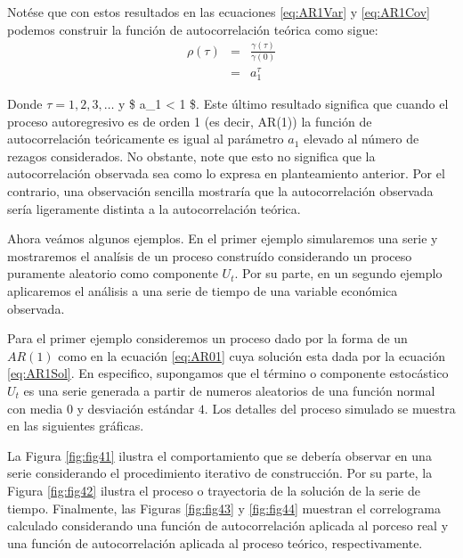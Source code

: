 \documentclass[
]{book}
\begin{document}
Notése que con estos resultados en las ecuaciones \eqref{eq:AR1Var} y \eqref{eq:AR1Cov} podemos construir la función de autocorrelación
teórica como sigue:
\begin{eqnarray}
    \rho(\tau) & = & \frac{\gamma(\tau)}{\gamma(0)} \nonumber \\
    & = & a_1^\tau
\end{eqnarray}

Donde \(\tau = 1, 2, 3, \ldots\) y \$ \textbar a\_1\textbar{} \textless{} 1 \$. Este último resultado significa que cuando el proceso autoregresivo es de orden 1
(es decir, AR(1)) la función de autocorrelación teóricamente es igual al parámetro \(a_1\) elevado al número de rezagos considerados. No obstante, note que esto no significa que la autocorrelación observada sea como lo expresa en planteamiento anterior. Por el contrario, una observación sencilla mostraría que la autocorrelación observada sería ligeramente distinta a la autocorrelación teórica.

Ahora veámos algunos ejemplos. En el primer ejemplo simularemos una serie y mostraremos el analísis de un proceso construído considerando un proceso puramente aleatorio como componente \(U_t\). Por su parte, en un segundo ejemplo aplicaremos el análisis a una serie de tiempo de una variable económica observada.

Para el primer ejemplo consideremos un proceso dado por la forma de un \(AR(1)\) como en la ecuación \eqref{eq:AR01} cuya solución esta dada por la ecuación \eqref{eq:AR1Sol}. En especifico, supongamos que el término o componente estocástico \(U_t\) es una serie generada a partir de numeros aleatorios de una función normal con media \(0\) y desviación estándar \(4\). Los detalles del proceso simulado se muestra en las siguientes gráficas.

La Figura \ref{fig:fig41} ilustra el comportamiento que se debería observar en una serie considerando el procedimiento iterativo de
construcción. Por su parte, la Figura \ref{fig:fig42} ilustra el proceso o trayectoria de la solución de la serie de tiempo. Finalmente, las Figuras \ref{fig:fig43} y \ref{fig:fig44} muestran el correlograma calculado considerando una función de autocorrelación aplicada al porceso real y una función de autocorrelación aplicada al proceso teórico, respectivamente.
\end{document}
